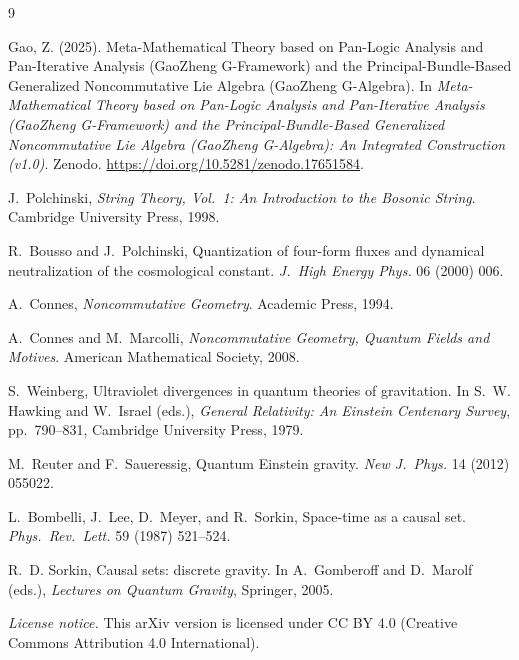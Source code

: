 \documentclass[11pt]{book}
\theoremstyle{plain}
\theoremstyle{definition}
\theoremstyle{remark}
\begin{document}
\begin{thebibliography}{9}

{}

Gao, Z. (2025).
\newblock Meta-Mathematical Theory based on Pan-Logic Analysis and
Pan-Iterative Analysis (GaoZheng G-Framework) and the
Principal-Bundle-Based Generalized Noncommutative Lie Algebra
(GaoZheng G-Algebra).
\newblock In \emph{Meta-Mathematical Theory based on Pan-Logic Analysis and
Pan-Iterative Analysis (GaoZheng G-Framework) and the
Principal-Bundle-Based Generalized Noncommutative Lie Algebra
(GaoZheng G-Algebra): An Integrated Construction (v1.0)}.
\newblock Zenodo.
\newblock \url{https://doi.org/10.5281/zenodo.17651584}.

J.~Polchinski,
\newblock \emph{String Theory, Vol.~1: An Introduction to the Bosonic String}.
\newblock Cambridge University Press, 1998.

R.~Bousso and J.~Polchinski,
\newblock Quantization of four-form fluxes and dynamical neutralization of the cosmological constant.
\newblock \emph{J.\ High Energy Phys.} 06 (2000) 006.

A.~Connes,
\newblock \emph{Noncommutative Geometry}.
\newblock Academic Press, 1994.

A.~Connes and M.~Marcolli,
\newblock \emph{Noncommutative Geometry, Quantum Fields and Motives}.
\newblock American Mathematical Society, 2008.

S.~Weinberg,
\newblock Ultraviolet divergences in quantum theories of gravitation.
\newblock In S.~W. Hawking and W.~Israel (eds.), \emph{General Relativity: An Einstein Centenary Survey}, pp.~790--831, Cambridge University Press, 1979.

M.~Reuter and F.~Saueressig,
\newblock Quantum Einstein gravity.
\newblock \emph{New J.\ Phys.} 14 (2012) 055022.

L.~Bombelli, J.~Lee, D.~Meyer, and R.~Sorkin,
\newblock Space-time as a causal set.
\newblock \emph{Phys.\ Rev.\ Lett.} 59 (1987) 521--524.

R.~D. Sorkin,
\newblock Causal sets: discrete gravity.
\newblock In A.~Gomberoff and D.~Marolf (eds.), \emph{Lectures on Quantum Gravity}, Springer, 2005.



\end{thebibliography}

\bigskip
\noindent
\textit{License notice.} This arXiv version is licensed under
CC BY 4.0 (Creative Commons Attribution 4.0 International).
\end{document}
